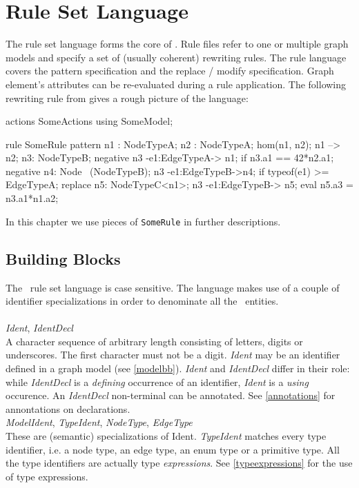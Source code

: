 \chapter{Rule Set Language}

The rule set language forms the core of \GrG. Rule files refer to one or multiple graph models and specify a set of (usually coherent) rewriting rules. The rule language covers the pattern specification and the replace / modify specification. Graph element's attributes can be re-evaluated during a rule application. The following rewriting rule from \cite{geiss} gives a rough picture of the language:
\begin{grgen}
actions SomeActions using SomeModel;

rule SomeRule {
  pattern {
    n1 : NodeTypeA;
    n2 : NodeTypeA;
    hom(n1, n2);
    n1 --> n2;
    n3: NodeTypeB;
    negative {
      n3 -e1:EdgeTypeA-> n1;
      if {n3.a1 == 42*n2.a1;}
    }
    negative {
      n4: Node \ (NodeTypeB);
      n3 -e1:EdgeTypeB->n4;
      if {typeof(e1) >= EdgeTypeA;}
    }
  }
  replace {
    n5: NodeTypeC<n1>;
    n3 -e1:EdgeTypeB-> n5;
    eval {
      n5.a3 = n3.a1*n1.a2;
    }
  }  
}
\end{grgen}
In this chapter we use pieces of \texttt{SomeRule} in further descriptions.

\section{Building Blocks}
\label{rulebb}

The \GrG\ rule set language is case sensitive. The language makes use of a couple of identifier specializations in order to denominate all the \GrG\ entities.\\
\\
\emph{Ident}, \emph{IdentDecl}\\ \nopagebreak
A character sequence of arbitrary length consisting of letters, digits or underscores. The first character must not be a digit. \emph{Ident} may be an identifier defined in a graph model (see \ref{modelbb}). \emph{Ident} and \emph{IdentDecl} differ in their role: while \emph{IdentDecl} is a \emph{defining} occurrence of an identifier, \emph{Ident} is a \emph{using} occurence. An \emph{IdentDecl} non-terminal can be annotated. See \ref{annotations} for annontations on declarations.
\\
\emph{ModelIdent}, \emph{TypeIdent}, \emph{NodeType}, \emph{EdgeType}\\
These are (semantic) specializations of Ident. \emph{TypeIdent} matches every type identifier, i.e. a node type, an edge type, an enum type or a primitive type. All the type identifiers are actually type \emph{expressions}. See \ref{typeexpressions} for the use of type expressions.\\

